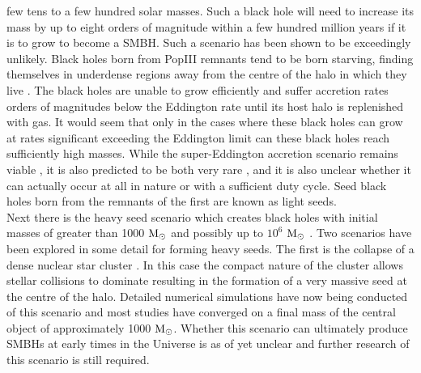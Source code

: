 \documentclass[graphics, twocolumn, usenatbib]{mn2e}
\newcommand{\msolar} {$\rm{M_{\odot}}~$}
\newcommand{\msolarc} {$\rm{M_{\odot}}$}
\begin{document}
few tens to a few hundred solar masses. Such a black hole will need to increase its mass by up to
eight orders of magnitude within a few hundred million years if it is to grow to become a SMBH. Such
a scenario has been shown to be exceedingly unlikely. Black holes born from PopIII remnants tend to
be born starving, finding themselves in underdense regions away from the centre of the halo in
which they live \citep{Whalen_2004, Milosavljevic_2009, Alvarez_2009, Smith_2018}. The black holes
are unable to grow efficiently and suffer accretion rates orders of magnitudes below the Eddington
rate until its host halo is replenished with gas. It would seem that only in the cases where these 
black holes can grow at rates significant
exceeding the Eddington limit can these black holes reach sufficiently high masses. While the
super-Eddington accretion scenario remains viable \citep{Madau_2001, Madau_2014, Alexander_2014,
  Lupi_2016}, it is also predicted to be both very rare \citep{Pacucci_2017}, and it is also unclear
whether it can actually occur at all in nature or with a sufficient duty cycle. Seed black holes born
from the remnants of the first are known as light seeds.\\
\indent Next there is the heavy seed scenario which creates black holes with initial masses of
greater than 1000 \msolar and possibly up to $10^{6}$ \msolar. Two scenarios have been
explored in some detail for forming heavy seeds. The first is the collapse of a dense
nuclear star cluster \citep{PortegiesZwart_2004, Freitag_2008, Devecchi_2008, Merritt_2008,
  Davies_2011, Lupi_2014}. In this case the compact nature of the cluster allows
stellar collisions to dominate resulting in the formation of a very massive seed at the
centre of the halo. Detailed numerical simulations have now being conducted \cite[e.g.][]{Katz_2015,
  Reinoso_2018} of this scenario and
most studies have converged on a final mass of the central object of approximately 1000 \msolarc.
Whether this scenario can ultimately produce SMBHs at early times in the Universe is as of yet
unclear and further research of this scenario is still required. \\
\end{document}
